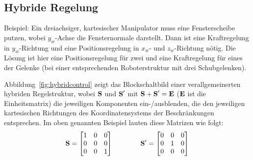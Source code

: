 		\subsection{Hybride Regelung}
			Beispiel: Ein dreiachsiger, kartesischer Manipulator muss eine Fensterscheibe putzen, wobei \( y_w \)-Achse die Fensternormale darstellt. Dann ist eine Kraftregelung in \(y_w\)-Richtung und eine Positionsregelung in \(x_w\)- und \(z_w\)-Richtung nötig. Die Lösung ist hier eine Positionsregelung für zwei und eine Kraftregelung für eines der Gelenke (bei einer entsprechenden Roboterstruktur mit drei Schubgelenken).
			
			Abbildung~\ref{fig:hybridcontrol} zeigt das Blockschaltbild einer verallgemeinerten hybriden Regelstruktur, wobei \( \boldsymbol{\mathrm{S}} \) und \( \boldsymbol{\mathrm{S}}' \) mit \( \boldsymbol{\mathrm{S}} + \boldsymbol{\mathrm{S}}' = \boldsymbol{\mathrm{E}} \) (\(\boldsymbol{\mathrm{E}}\) ist die Einheitsmatrix) die jeweiligen Komponenten ein-/ausblenden, die den jeweiligen kartesischen Richtungen des Koordinatensystems der Beschränkungen entsprechen. Im oben genannten Beispiel lauten diese Matrizen wie folgt:
			\begin{equation*}
				\boldsymbol{\mathrm{S}} =
					\begin{bmatrix}
						1 & 0 & 0 \\
						0 & 0 & 0 \\
						0 & 0 & 1
					\end{bmatrix}
				\quad\quad\quad\quad
				\boldsymbol{\mathrm{S}}' =
					\begin{bmatrix}
						0 & 0 & 0 \\
						0 & 1 & 0 \\
						0 & 0 & 0
					\end{bmatrix}
			\end{equation*}
			
